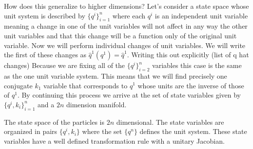 \documentclass{article}
\begin{document}

	How does this generalize to higher dimensions? Let's consider a state space whose unit system is described by $\{ q^i \}^n_{i=1}$ where each $q^i$ is an independent unit variable meaning a change in one of the unit variables will not affect in any way the other unit variables and that this change will be a function only of the original unit variable. Now we will perform individual changes of unit variables. We will write the first of these changes as $\hat{q}^1(q^1) = \hat{q}^1$. Writing this out explicitly (list of q hat changes) Because we are fixing all of the $\{ q^i \}^n_{i=2}$ variables this case is the same as the one unit variable system. This means that we will find precisely one conjugate $k_1$ variable that corresponds to $q^1$ whose units are the inverse of those of $q^1$. By continuing this process we arrive at the set of state variables given by $\{ q^i, k_i \}^n_{i=1}$ and a $2n$ dimension manifold.
\begin{prop}
	The state space of the particles is $2n$ dimensional. The state variables are organized in pairs $\{q^i, k_i\}$ where the set $\{q^n\}$ defines the unit system. These state variables have a well defined transformation rule with a unitary Jacobian.
\end{prop}
\end{document}
